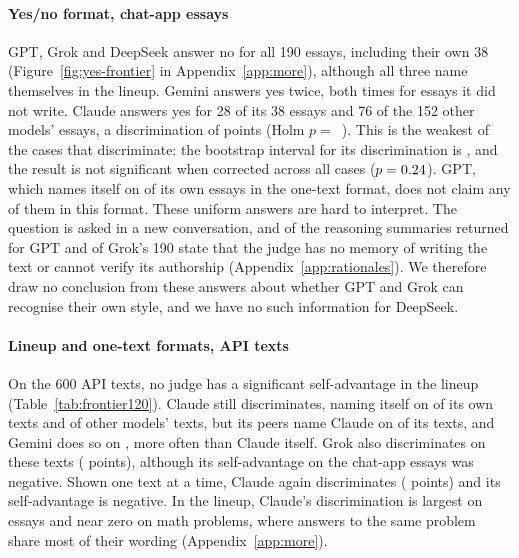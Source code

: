 \paragraph{Yes/no format, chat-app essays}
GPT, Grok and DeepSeek answer no for all 190 essays, including their own 38
(Figure~\ref{fig:yes-frontier} in Appendix~\ref{app:more}), although all three name themselves in the
lineup. Gemini answers yes twice, both times for essays it did not write. Claude
answers yes for 28 of its 38 essays and 76 of the 152 other models'
essays, a discrimination of \FBClaudeDisc{} points (Holm
$p=$~\FBClaudeHolm{}). This is the weakest of the \CVdisc{} cases that
discriminate: the bootstrap interval for its discrimination is
\CXClaudeYesNoDiscCI{}, and the result is not significant when corrected
across all \CVcells{} cases ($p=0.24$). GPT, which names
itself on \GPTSelfSingle{} of its own essays in the one-text format, does not claim any of
them in this format. These uniform answers are hard to interpret. The question
is asked in a new conversation, and \CXReasonGPTBroad{} of the
\CXReasonGPTN{} reasoning summaries returned for GPT and \CXReasonGrokBroad{}
of Grok's 190 state that the judge has no memory of writing the text or cannot
verify its authorship (Appendix~\ref{app:rationales}). We therefore draw no
conclusion from these answers about whether GPT and Grok can recognise their
own style, and we have no such information for DeepSeek.



\paragraph{Lineup and one-text formats, API texts}
On the 600 API texts, no judge has a significant self-advantage in the lineup
(Table~\ref{tab:frontier120}). Claude still discriminates, naming itself on
\FXClaudeLineupSelf{} of its own texts and \FXClaudeLineupFA{} of other models'
texts, but its peers name Claude on \FXClaudeLineupPeer{} of its texts, and
Gemini does so on \CRGeminiOnClaudeApiHit{}, more often than Claude itself.
Grok also discriminates on these texts (\FXGrokLineupDisc{} points), although
its self-advantage on the chat-app essays was negative. Shown one text at a
time, Claude again discriminates (\FXClaudeSingleDisc{} points) and its
self-advantage is negative. In the lineup, Claude's discrimination is largest
on essays and near zero on math problems, where answers to the same problem share most of
their wording (Appendix~\ref{app:more}).

